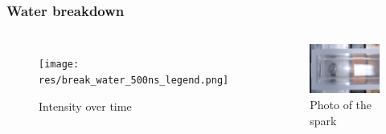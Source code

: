 \documentclass{beamer}
\begin{document}
	\begin{frame}
		\frametitle{Water breakdown}
		\begin{columns}
			\begin{figure}
				\centering
				\texttt{[image: res/break\_water\_500ns\_legend.png]}
				\caption*{Intensity over time}
			\end{figure}	
			\begin{figure}
				\centering
				\includegraphics[width=\linewidth]{res/water_spark.png}
				\caption*{Photo of the spark}
			\end{figure}
		\end{columns}
	\end{frame}	
\end{document}
